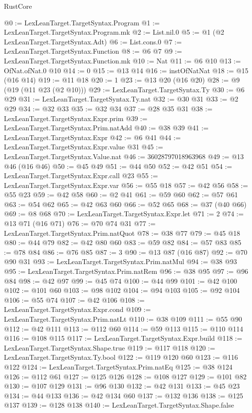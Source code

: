 \begin{lexlean}{RustCore}
\begin{coremodule}
@0 := LexLeanTarget.TargetSyntax.Program
@1 := LexLeanTarget.TargetSyntax.Program.mk
@2 := List.nil.{0}
@5 := @1 (@2 LexLeanTarget.TargetSyntax.Adt)
@6 := List.cons.{0}
@7 := LexLeanTarget.TargetSyntax.Function
@8 := @6 @7
@9 := LexLeanTarget.TargetSyntax.Function.mk
@10 := Nat
@11 := @6 @10
@13 := OfNat.ofNat.{0} @10
@14 := 0
@15 := @13 @14
@16 := instOfNatNat
@18 := @15 (@16 @14)
@19 := @11 @18
@20 := 1
@23 := @13 @20 (@16 @20)
@28 := @9 (@19 (@11 @23 (@2 @10)))
@29 := LexLeanTarget.TargetSyntax.Ty
@30 := @6 @29
@31 := LexLeanTarget.TargetSyntax.Ty.nat
@32 := @30 @31
@33 := @2 @29
@34 := @32 @33
@35 := @32 @34
@37 := @28 @35 @31
@38 := LexLeanTarget.TargetSyntax.Expr.prim
@39 := LexLeanTarget.TargetSyntax.Prim.natAdd
@40 := @38 @39
@41 := LexLeanTarget.TargetSyntax.Expr
@42 := @6 @41
@44 := LexLeanTarget.TargetSyntax.Expr.value @31
@45 := LexLeanTarget.TargetSyntax.Value.nat
@46 := 36028797018963968
@49 := @13 @46 (@16 @46)
@50 := @45 @49
@51 := @44 @50
@52 := @42 @51
@54 := LexLeanTarget.TargetSyntax.Expr.call @23
@55 := LexLeanTarget.TargetSyntax.Expr.var
@56 := @55 @18
@57 := @42 @56
@58 := @55 @23
@59 := @42 @58
@60 := @2 @41
@61 := @59 @60
@62 := @57 @61
@63 := @54 @62
@65 := @42 @63 @60
@66 := @52 @65
@68 := @37 (@40 @66)
@69 := @8 @68
@70 := LexLeanTarget.TargetSyntax.Expr.let
@71 := 2
@74 := @13 @71 (@16 @71)
@76 := @70 @74 @31
@77 := LexLeanTarget.TargetSyntax.Prim.natQuot
@78 := @38 @77
@79 := @45 @18
@80 := @44 @79
@82 := @42 @80 @60
@83 := @59 @82
@84 := @57 @83
@85 := @78 @84
@86 := @76 @85
@87 := 3
@90 := @13 @87 (@16 @87)
@92 := @70 @90 @31
@93 := LexLeanTarget.TargetSyntax.Prim.natMul
@94 := @38 @93
@95 := LexLeanTarget.TargetSyntax.Prim.natRem
@96 := @38 @95
@97 := @96 @84
@98 := @42 @97
@99 := @45 @74
@100 := @44 @99
@101 := @42 @100
@102 := @101 @60
@103 := @98 @102
@104 := @94 @103
@105 := @92 @104
@106 := @55 @74
@107 := @42 @106
@108 := LexLeanTarget.TargetSyntax.Expr.cond
@109 := LexLeanTarget.TargetSyntax.Prim.natLt
@110 := @38 @109
@111 := @55 @90
@112 := @42 @111
@113 := @112 @60
@114 := @59 @113
@115 := @110 @114
@116 := @108 @115
@117 := LexLeanTarget.TargetSyntax.Expr.build
@118 := LexLeanTarget.TargetSyntax.Shape.true
@119 := @117 @118
@120 := LexLeanTarget.TargetSyntax.Ty.bool
@122 := @119 @120 @60
@123 := @116 @122
@124 := LexLeanTarget.TargetSyntax.Prim.natEq
@125 := @38 @124
@126 := @112 @61
@127 := @125 @126
@128 := @108 @127
@129 := @101 @82
@130 := @107 @129
@131 := @96 @130
@132 := @42 @131
@133 := @45 @23
@134 := @44 @133
@136 := @42 @134 @60
@137 := @132 @136
@138 := @125 @137
@139 := @128 @138
@140 := LexLeanTarget.TargetSyntax.Shape.false

\end{coremodule}
\end{lexlean}
